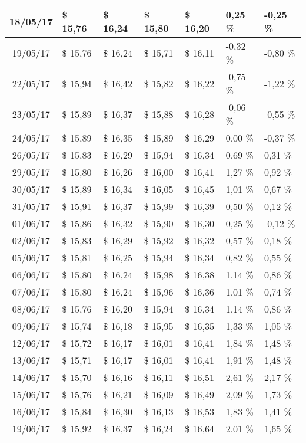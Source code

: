 \begin{center}
\begin{longtable}{|c|p{1.5cm}|p{1.5cm}|p{1.5cm}|p{1.5cm}|p{1.5cm}|p{1.5cm}|}
18/05/17 & \$ 15,76 & \$ 16,24 & \$ 15,80 & \$ 16,20 & 0,25 \% & -0,25 \% \\ \hline
19/05/17 & \$ 15,76 & \$ 16,24 & \$ 15,71 & \$ 16,11 & -0,32 \% & -0,80 \% \\ \hline
22/05/17 & \$ 15,94 & \$ 16,42 & \$ 15,82 & \$ 16,22 & -0,75 \% & -1,22 \% \\ \hline
23/05/17 & \$ 15,89 & \$ 16,37 & \$ 15,88 & \$ 16,28 & -0,06 \% & -0,55 \% \\ \hline
24/05/17 & \$ 15,89 & \$ 16,35 & \$ 15,89 & \$ 16,29 & 0,00 \% & -0,37 \% \\ \hline
26/05/17 & \$ 15,83 & \$ 16,29 & \$ 15,94 & \$ 16,34 & 0,69 \% & 0,31 \% \\ \hline
29/05/17 & \$ 15,80 & \$ 16,26 & \$ 16,00 & \$ 16,41 & 1,27 \% & 0,92 \% \\ \hline
30/05/17 & \$ 15,89 & \$ 16,34 & \$ 16,05 & \$ 16,45 & 1,01 \% & 0,67 \% \\ \hline
31/05/17 & \$ 15,91 & \$ 16,37 & \$ 15,99 & \$ 16,39 & 0,50 \% & 0,12 \% \\ \hline
01/06/17 & \$ 15,86 & \$ 16,32 & \$ 15,90 & \$ 16,30 & 0,25 \% & -0,12 \% \\ \hline
02/06/17 & \$ 15,83 & \$ 16,29 & \$ 15,92 & \$ 16,32 & 0,57 \% & 0,18 \% \\ \hline
05/06/17 & \$ 15,81 & \$ 16,25 & \$ 15,94 & \$ 16,34 & 0,82 \% & 0,55 \% \\ \hline
06/06/17 & \$ 15,80 & \$ 16,24 & \$ 15,98 & \$ 16,38 & 1,14 \% & 0,86 \% \\ \hline
07/06/17 & \$ 15,80 & \$ 16,24 & \$ 15,96 & \$ 16,36 & 1,01 \% & 0,74 \% \\ \hline
08/06/17 & \$ 15,76 & \$ 16,20 & \$ 15,94 & \$ 16,34 & 1,14 \% & 0,86 \% \\ \hline
09/06/17 & \$ 15,74 & \$ 16,18 & \$ 15,95 & \$ 16,35 & 1,33 \% & 1,05 \% \\ \hline
12/06/17 & \$ 15,72 & \$ 16,17 & \$ 16,01 & \$ 16,41 & 1,84 \% & 1,48 \% \\ \hline
13/06/17 & \$ 15,71 & \$ 16,17 & \$ 16,01 & \$ 16,41 & 1,91 \% & 1,48 \% \\ \hline
14/06/17 & \$ 15,70 & \$ 16,16 & \$ 16,11 & \$ 16,51 & 2,61 \% & 2,17 \% \\ \hline
15/06/17 & \$ 15,76 & \$ 16,21 & \$ 16,09 & \$ 16,49 & 2,09 \% & 1,73 \% \\ \hline
16/06/17 & \$ 15,84 & \$ 16,30 & \$ 16,13 & \$ 16,53 & 1,83 \% & 1,41 \% \\ \hline
19/06/17 & \$ 15,92 & \$ 16,37 & \$ 16,24 & \$ 16,64 & 2,01 \% & 1,65 \% \\ \hline

\end{longtable}
\end{center}
